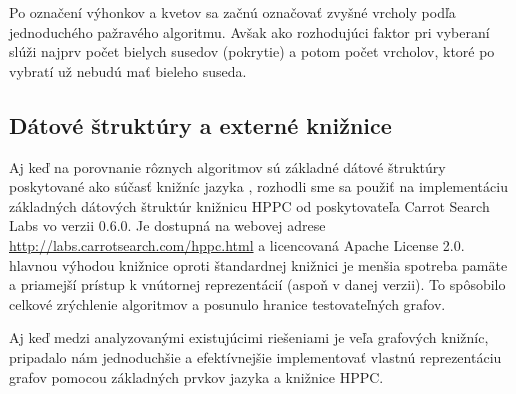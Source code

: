 Po označení výhonkov a kvetov sa začnú označovať zvyšné vrcholy podľa 
jednoduchého pažravého algoritmu. Avšak ako rozhodujúci faktor pri vyberaní 
slúži najprv počet bielych susedov (pokrytie) a potom počet vrcholov, ktoré 
po vybratí už nebudú mať bieleho suseda.

\subsection{Dátové štruktúry a externé knižnice}

Aj keď na porovnanie rôznych algoritmov sú základné dátové štruktúry 
poskytované ako súčasť knižníc jazyka \Java, rozhodli sme sa použiť na 
implementáciu základných dátových štruktúr knižnicu HPPC od poskytovateľa 
Carrot Search Labs vo verzii 0.6.0. Je dostupná na webovej adrese 
\url{http://labs.carrotsearch.com/hppc.html} a licencovaná Apache License 2.0. 
hlavnou výhodou knižnice oproti štandardnej knižnici je menšia spotreba pamäte 
a priamejší prístup k vnútornej reprezentácií (aspoň v danej verzii). To 
spôsobilo celkové zrýchlenie algoritmov a posunulo hranice testovateľných 
grafov.

Aj keď medzi analyzovanými existujúcimi riešeniami je veľa grafových knižníc, 
pripadalo nám jednoduchšie a efektívnejšie implementovať vlastnú reprezentáciu 
grafov pomocou základných prvkov jazyka \Java a knižnice HPPC.


